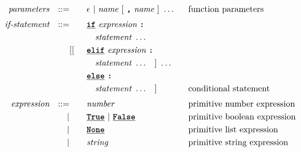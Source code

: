 \begin{alignat*}{9}
&& \textit{parameters}   && ::= &\quad &&  \epsilon\ | \  \textit{name} \ 
                                                   [\ \textbf{\texttt{,}} \ \textit{name}\ ]\ \ldots
                                                            && \textrm{function parameters}   \\[1mm]
&& \textit{if-statement} && ::= &\quad &&  \textbf{\texttt{\underline{if}}}\ \textit{expression} \ 
                                           \textbf{\texttt{:}}  \\
&&                       &&     &\quad && \quad \textit{statement} \ \ldots \quad
                                                           &&  \\  
&&                       &&     &      [[&& \textbf{\texttt{\underline{elif}}} \ \textit{expression} \
                                          \textbf{\texttt{:}} \\ 
&&                       &&     &\quad && \quad \textit{statement} \ \ldots \quad ] \ \ldots \quad 
                                                           &&  \\     
&&                       &&     &      && \textbf{\texttt{\underline{else}}}\
                                          \textbf{\texttt{:}} \\
&&                       &&     &\quad && \quad \textit{statement} \ \ldots \quad ]
                                                           && \textrm{conditional statement}  \\[1mm]
&& \textit{expression}   && ::= &\quad &&  \textit{number}   && \textrm{primitive number expression}\\
&&                       && |   &\quad && \textbf{\texttt{\underline{True}}}\ |\ \textbf{\texttt{\underline{False}}}
                                                           && \textrm{primitive boolean expression}\\
&&                       && |   &\quad &&  \textbf{\texttt{\underline{None}}} \   && \textrm{primitive list expression}\\
&&                       && |   &\quad &&  \textit{string}   && \textrm{primitive string expression}\\

\end{alignat*}
